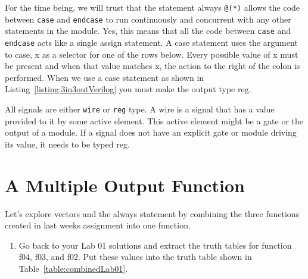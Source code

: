 For the time being, we will trust that the statement always \verb+@(*)+ allows
the code between \verb+case+ and \verb+endcase+ to run continuously and concurrent
with any other statements in the module. Yes, this means that all the
code between \verb+case+ and \verb+endcase+ acts like a single assign statement. A
case statement uses the argument to case, x as a selector
for one of the rows below. Every possible value of x must be present and
when that value matches x, the action to the right of the colon is
performed. When we use a case statement as shown in Listing~\ref{listing:3in3outVerilog} 
you must make the output type reg.

All signals are either \verb+wire+ or \verb+reg+ type. A wire is a signal that has a
value provided to it by some active element. This active element might
be a gate or the output of a module. If a signal does not have an
explicit gate or module driving its value, it needs to be typed reg.

\hypertarget{part-1-combine-lab-1-functions.}{%
\section{A Multiple Output Function}\label{part-1-combine-lab-1-functions.}}

Let's explore vectors and the always statement by combining the three
functions created in last weeks assignment into one function.

\begin{enumerate}
\def\labelenumi{\arabic{enumi}.}
\item
  Go back to your Lab 01 solutions and extract the truth tables for
  function f04, f03, and f02. Put these values into the truth table
  shown in Table~\ref{table:combinedLab01}.
\end{enumerate}

